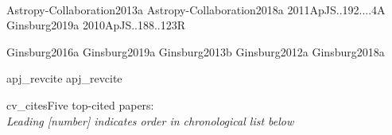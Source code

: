 \documentclass[12pt]{article}
\begin{document}

  









%




%


%



%





%
%
%
%
%






\nocite{biba}{Astropy-Collaboration2013a}
\nocite{biba}{Astropy-Collaboration2018a}
\nocite{biba}{2011ApJS..192....4A}
\nocite{biba}{Ginsburg2019a}
\nocite{biba}{2010ApJS..188..123R}

\nocite{bibb}{Ginsburg2016a}
\nocite{bibb}{Ginsburg2019a}
\nocite{bibb}{Ginsburg2013b}
\nocite{bibb}{Ginsburg2012a}
\nocite{bibb}{Ginsburg2018a}

{apj_revcite}
{apj_revcite}
%
%

\vspace{-18pt}
{cv_cites}{Five top-cited papers:\\ {\it Leading [number] indicates order in chronological list below}}
%
\end{document}
